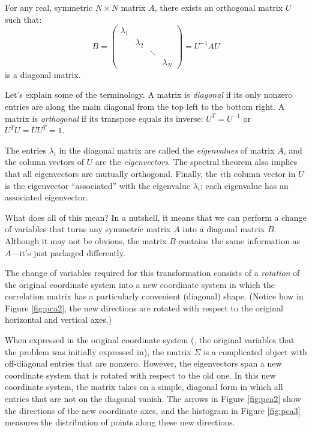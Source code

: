 For any real, symmetric $N \times N$ matrix $A$, there exists an 
orthogonal matrix $U$ such that:
%
\[
B =
\begin{pmatrix}
\lambda_1 &           &        &           \\
          & \lambda_2 &        &           \\
          &           & \ddots &           \\
          &           &        & \lambda_N
\end{pmatrix}
= U^{-1} A U
\]
is a diagonal matrix.


Let's explain some of the terminology. A matrix is \emph{diagonal} if
its only nonzero entries are along the main diagonal from the top left
to the bottom right. A matrix is \emph{orthogonal} if its transpose
equals its inverse: $U^T = U^{-1}$ or $U^T U = U U^T = 1$.

The entries $\lambda_i$ in the diagonal matrix are called the
\emph{eigenvalues} of matrix $A$, and the column vectors of $U$ are the
\emph{eigenvectors}. The
spectral theorem also implies that all eigenvectors are mutually
orthogonal. Finally, the $i$th column vector in $U$ is the eigenvector
``associated'' with the eigenvalue
$\lambda_i$; each eigenvalue has an associated eigenvector.

What does all of this mean?  In a nutshell, it means that we can
perform a change of variables that turns any symmetric matrix $A$ into
a diagonal matrix $B$.  Although it may not be obvious, the matrix $B$
contains the same information as $A$---it's just packaged differently.

The change of variables required for this transformation consists of a
\emph{rotation} of the original coordinate system into a new
coordinate system in which the correlation matrix has a particularly
convenient (diagonal) shape. (Notice how in Figure \ref{fig:pca2}, the
new directions are rotated with respect to the original horizontal and
vertical axes.)

When expressed in the original coordinate system (\ie, the original
variables that the problem was initially expressed in), the matrix
$\Sigma$ is a complicated object with off-diagonal entries that are
nonzero.  However, the eigenvectors span a new coordinate system that
is rotated with respect to the old one. In this new coordinate system,
the matrix takes on a simple, diagonal form in which all entries that
are not on the diagonal vanish. The arrows in Figure \ref{fig:pca2}
show the directions of the new coordinate axes, and the histogram in
Figure \ref{fig:pca3} measures the distribution of points along these
new directions.

